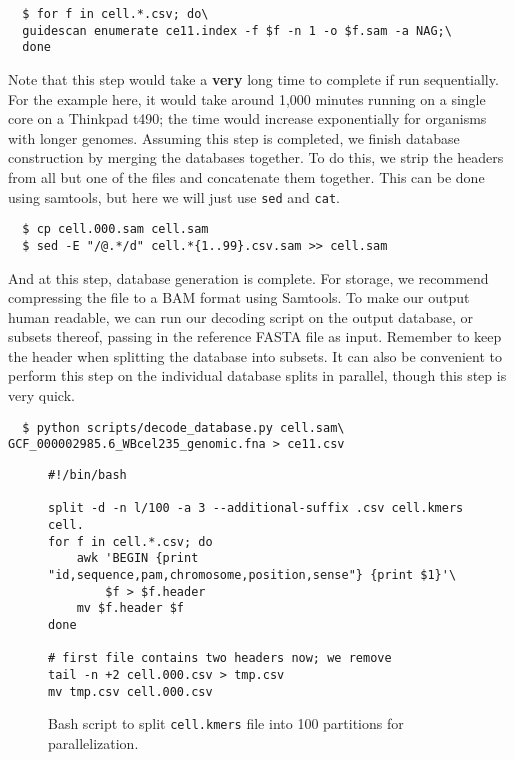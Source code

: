 \documentclass[11pt]{article}
\begin{document}
\begin{verbatim}
  $ for f in cell.*.csv; do\
  guidescan enumerate ce11.index -f $f -n 1 -o $f.sam -a NAG;\
  done
\end{verbatim}

Note that this step would take a \textbf{very} long time to complete
if run sequentially. For the example here, it would take around 1,000
minutes running on a single core on a Thinkpad t490; the time would
increase exponentially for organisms with longer genomes. Assuming
this step is completed, we finish database construction by merging the
databases together. To do this, we strip the headers from all but one
of the files and concatenate them together. This can be done using
samtools, but here we will just use \texttt{sed} and \texttt{cat}.

\begin{verbatim}
  $ cp cell.000.sam cell.sam
  $ sed -E "/@.*/d" cell.*{1..99}.csv.sam >> cell.sam
\end{verbatim}

And at this step, database generation is complete. For storage, we
recommend compressing the file to a BAM format using Samtools. To make
our output human readable, we can run our decoding script on the
output database, or subsets thereof, passing in the reference FASTA
file as input. Remember to keep the header when splitting the database
into subsets. It can also be convenient to perform this step on the
individual database splits in parallel, though this step is very
quick.

\vspace{-0.8em}
\begin{verbatim}
  $ python scripts/decode_database.py cell.sam\ GCF_000002985.6_WBcel235_genomic.fna > ce11.csv
\end{verbatim}

\begin{figure}[ht]
  \centering
\begin{verbatim}
#!/bin/bash

split -d -n l/100 -a 3 --additional-suffix .csv cell.kmers cell.
for f in cell.*.csv; do
    awk 'BEGIN {print "id,sequence,pam,chromosome,position,sense"} {print $1}'\
        $f > $f.header
    mv $f.header $f
done

# first file contains two headers now; we remove
tail -n +2 cell.000.csv > tmp.csv
mv tmp.csv cell.000.csv
\end{verbatim}
\caption{\label{fig:splitkmers} Bash script to split
  \texttt{cell.kmers} file into 100 partitions for parallelization.}
\end{figure}
\end{document}
